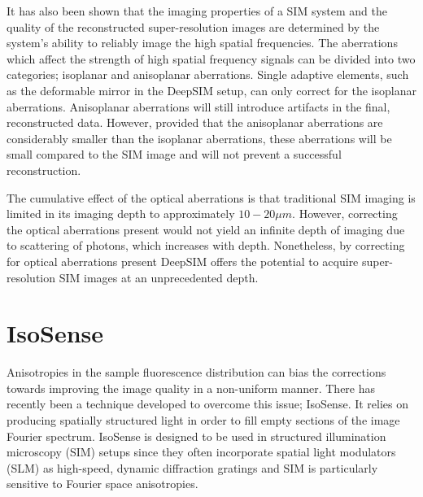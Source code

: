 It has also been shown that the imaging properties of a SIM
system and the quality of the reconstructed super-resolution
images are determined by the system's ability to reliably
image the high spatial frequencies.\cite{debarre2008adaptive,thomas2015enhanced}
The aberrations which affect the strength of high spatial 
frequency signals can be divided into two categories; 
isoplanar and anisoplanar aberrations. Single adaptive 
elements, such as the deformable mirror in the DeepSIM 
setup, can only correct for the isoplanar aberrations.
Anisoplanar aberrations will still introduce artifacts 
in the final, reconstructed data. However, provided that
the anisoplanar aberrations are considerably smaller than
the isoplanar aberrations, these aberrations will be small
compared to the SIM image and will not prevent a successful
reconstruction.\cite{thomas2015enhanced}

The cumulative effect of the optical aberrations is that
traditional SIM imaging is limited in its imaging depth to
approximately $10-20\mu m$.\cite{schermelleh2019super,wu2018faster} However, 
correcting the optical aberrations present would not yield
an infinite depth of imaging due to scattering of photons,
which increases with depth. Nonetheless, by correcting for
optical aberrations present DeepSIM offers the potential to 
acquire super-resolution SIM images at an unprecedented depth.

\section{IsoSense}
\label{sec:isosense}

Anisotropies in the sample fluorescence distribution can bias 
the corrections towards improving the image quality in a 
non-uniform manner. There has recently been a technique developed 
to overcome  this issue; IsoSense\cite{vzurauskas2019isosense}. 
It relies  on producing spatially structured light in order to fill 
empty sections of the image Fourier spectrum. IsoSense is designed 
to be used in structured illumination microscopy (SIM) setups since 
they often incorporate spatial light modulators (SLM) as high-speed, 
dynamic diffraction  gratings and SIM is particularly sensitive to 
Fourier space anisotropies.

